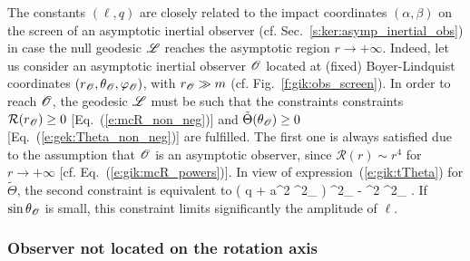 The constants $(\ell,q)$ are closely related to the impact coordinates $(\alpha,\beta)$
on the screen of an asymptotic inertial observer (cf. Sec.~\ref{s:ker:asymp_inertial_obs})
in case the null geodesic $\mathscr{L}$ reaches the asymptotic region $r\to +\infty$.
Indeed, let us consider an asymptotic inertial observer $\mathscr{O}$ located at (fixed) Boyer-Lindquist
coordinates $(r_{\mathscr{O}}, \theta_{\mathscr{O}}, \varphi_{\mathscr{O}})$, with $r_{\mathscr{O}} \gg m$ (cf. Fig.~\ref{f:gik:obs_screen}).
In order to reach $\mathscr{O}$, the geodesic $\mathscr{L}$ must be such that the constraints
constraints $\mathcal{R}(r_{\mathscr{O}}) \geq 0$
[Eq.~(\ref{e:mcR_non_neg})]
and $\tilde\Theta(\theta_{\mathscr{O}}) \geq 0$ [Eq.~(\ref{e:gek:Theta_non_neg})]
are fulfilled.
The first one is always satisfied due to the
assumption that $\mathscr{O}$ is an asymptotic observer, since
$\mathcal{R}(r) \sim r^4$ for $r\to +\infty$ [cf. Eq.~(\ref{e:gik:mcR_powers})].
In view of expression~(\ref{e:gik:tTheta}) for $\tilde\Theta$, the second
constraint is equivalent to
\be \label{e:gik:constraint_theta_obs}
    \left( q + a^2 \cos^2\th_{\Obs} \right) \sin^2\th_{\Obs}
         - \ell^2 \cos^2\th_{\Obs}  .
\ee
If $\sin\theta_{\mathscr{O}}$ is small,
this constraint limits significantly the amplitude of $\ell$.

\subsubsection{Observer not located on the rotation axis}

